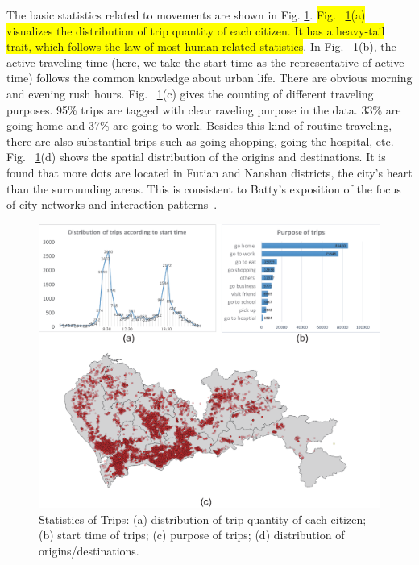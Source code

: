\documentclass{ieeeaccess}
\begin{document}
The basic statistics related to movements are shown in Fig. \ref{fig:data_geometry}. \colorbox{yellow}{Fig. ~\ref{fig:data_geometry}(a) visualizes the distribution of trip quantity of each citizen. It has a heavy-tail trait, which follows the law of most human-related statistics}. In Fig. ~\ref{fig:data_geometry}(b), the active traveling time (here, we take the start time as the representative of active time) follows the common knowledge about urban life. There are obvious morning and evening rush hours. Fig. ~\ref{fig:data_geometry}(c) gives the counting of different traveling purposes. 95\% trips are tagged with clear raveling purpose in the data. 33\% are going home and 37\% are going to work. Besides this kind of routine traveling, there are also substantial trips such as going shopping, going the hospital, etc. Fig. ~\ref{fig:data_geometry}(d) shows the spatial distribution of the origins and destinations. It is found that more dots are located in Futian and Nanshan districts, the city's heart than the surrounding areas. This is consistent to Batty's exposition of the focus of city networks and interaction patterns~\cite{batty2013new}.

\begin{figure}[htb!]
 \centering %
 \includegraphics[width=\columnwidth]{pictures/data3}
 \caption{Statistics of Trips: (a) distribution of trip quantity of each citizen; (b) start time of trips; (c) purpose of trips; (d) distribution of origins/destinations. }
 \label{fig:data_geometry}
\end{figure}
\end{document}
